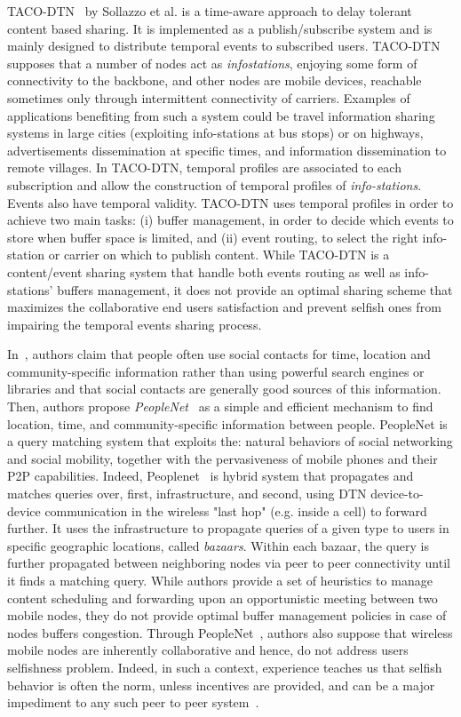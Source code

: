 TACO-DTN~\cite{TACODTN} by Sollazzo et al. is a time-aware approach to delay tolerant content based sharing. It is implemented as a publish/subscribe system and is mainly designed to distribute temporal events to subscribed users. TACO-DTN supposes that a number of nodes act as \emph{infostations}, enjoying some form of connectivity to the backbone, and other nodes are mobile devices, reachable sometimes only through intermittent connectivity of carriers. Examples of applications benefiting from such a system could be travel information sharing systems in large cities (exploiting info-stations at bus stops) or on highways, advertisements dissemination at specific times, and information dissemination to remote villages. In TACO-DTN, temporal profiles are associated to each subscription and allow the construction of temporal profiles of \emph{info-stations}. Events also have temporal validity. TACO-DTN uses temporal profiles in order to achieve two main tasks: (i) buffer management, in order to decide which events to store when buffer space is limited, and (ii) event routing, to select the right info-station or carrier on which to publish content. While TACO-DTN is a content/event sharing system that handle both events routing as well as info-stations' buffers management, it does not provide an optimal sharing scheme that maximizes the collaborative end users satisfaction and prevent selfish ones from impairing the temporal events sharing process.

In~\cite{Peoplenet}, authors claim that people often use social contacts for time, location and community-specific information rather than using powerful search engines or libraries and that social contacts are generally good sources of this information. Then, authors propose  \emph{PeopleNet}~\cite{Peoplenet} as a simple and efficient mechanism to find location, time, and community-specific information between people. PeopleNet is a query matching system that exploits the: natural behaviors of social networking and social mobility, together with the pervasiveness of mobile phones and their P2P capabilities. Indeed, Peoplenet~\cite{Peoplenet} is hybrid system that propagates and matches queries over, first, infrastructure, and second, using DTN device-to-device communication in the wireless "last hop" (e.g. inside a cell) to forward further. It uses the  infrastructure to propagate queries of a given type to users in specific geographic locations, called \emph{bazaars}. Within each bazaar, the query is further propagated between neighboring nodes via peer to peer connectivity until it finds a matching query. While authors provide a set of heuristics to manage content scheduling and forwarding upon an opportunistic meeting between two mobile nodes, they do not provide optimal buffer management policies in case of nodes buffers congestion. Through PeopleNet~\cite{Peoplenet}, authors also suppose that wireless mobile nodes are inherently collaborative and hence, do not address users selfishness problem. Indeed, in such a context, experience teaches us that selfish behavior is often the norm, unless incentives are provided, and can be a major impediment to any such peer to peer system~\cite{NashEquilibria}.
  
